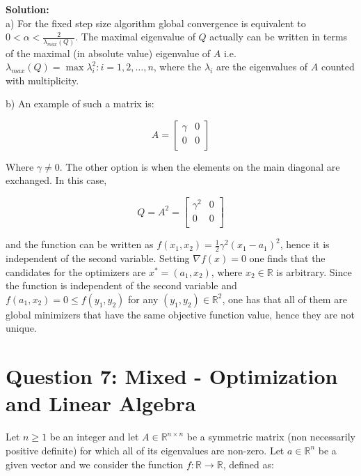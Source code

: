 \documentclass[12pt]{article}
\begin{document}
	\begin{framed}
		\textbf{Solution:}\\
		a) For the fixed step size algorithm global convergence is equivalent to $0 < \alpha < \frac{2}{\lambda_{max}(Q)}$. The maximal eigenvalue of $Q$ actually can be written in terms of the maximal (in absolute value) eigenvalue of $A$ i.e. $\lambda_{max}(Q) = \max {\lambda_i^2 : i = 1, 2, \dots , n}$, where the $\lambda_i$ are the eigenvalues of $A$ counted with multiplicity.
		
		b) An example of such a matrix is:
		
		\begin{equation}
			A = \begin{bmatrix}
				\gamma & 0 \\
				0 & 0 \\
			\end{bmatrix}
		\end{equation}
		
		Where $\gamma \neq 0$. The other option is when the elements on the main diagonal are exchanged. In this case,
		
		\begin{equation}
			Q = A^2 = \begin{bmatrix}
									\gamma^2 & 0 \\
									0 & 0 \\
								\end{bmatrix}
		\end{equation}
		
		and the function can be written as $f(x_1,x_2) = \frac{1}{2} \gamma^2 (x_1 - a_1)^2$, hence it is independent of the second variable. Setting $\nabla f(x) = 0$ one finds that the candidates for the optimizers are $x^* = (a_1,x_2)$, where $x_2 \in \mathbb{R}$ is arbitrary. Since the function is independent of the second variable and $f(a_1,x_2) = 0 \leq f(y_1,y_2)$ for any $(y_1, y_2) \in \mathbb{R}^2$, one has that all of them are global minimizers that have the same objective function value, hence they are not unique.
		
	\end{framed}
	
	\section*{Question 7: Mixed - Optimization and Linear Algebra \cite{q4}}
	Let $n \geq 1$ be an integer and let $A \in \mathbb{R}^{n \times n}$ be a symmetric matrix (non necessarily positive definite) for which all of its eigenvalues are non-zero. Let $a \in \mathbb{R}^n$ be a given vector and we consider the function $f:\mathbb{R} \rightarrow \mathbb{R}$, defined as:
\end{document}
